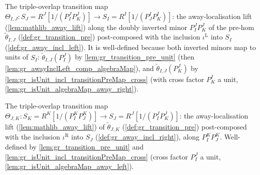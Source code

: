\begin{definition}

  \label{def:gr_cocycle_theta_ij}
  The triple-overlap transition map
  \(\Theta_{I,J} : S_J = R^J[1/(P^J_I P^J_K)] \to S_I = R^I[1/(P^I_J P^I_K)]\):
  the away-localisation lift (\cref{lem:mathlib_away_lift}) along the doubly
  inverted minor \(P^J_I P^J_K\) of the pre-hom \(\tilde\theta_{I,J}\)
  (\cref{def:gr_transition_pre}) post-composed with the inclusion
  \(\iota^{\mathrm{L}}\) into \(S_I\) (\cref{def:gr_away_incl_left}). It is
  well-defined because both inverted minors map to units of \(S_I\):
  \(\tilde\theta_{I,J}(P^J_I)\) by \cref{lem:gr_transition_pre_unit} (then
  \cref{lem:gr_awayInclLeft_comp_algebraMap}), and \(\tilde\theta_{I,J}(P^J_K)\)
  by \cref{lem:gr_isUnit_incl_transitionPreMap_cross} (with cross factor
  \(P^I_K\) a unit, \cref{lem:gr_isUnit_algebraMap_away_right}).
\end{definition}

\begin{definition}

  \label{def:gr_cocycle_theta_jk}
  The triple-overlap transition map
  \(\Theta_{J,K} : S_K = R^K[1/(P^K_I P^K_J)] \to S_J = R^J[1/(P^J_I P^J_K)]\):
  the away-localisation lift (\cref{lem:mathlib_away_lift}) of
  \(\tilde\theta_{J,K}\) (\cref{def:gr_transition_pre}) post-composed with the
  inclusion \(\iota^{\mathrm{R}}\) into \(S_J\) (\cref{def:gr_away_incl_right}),
  along \(P^K_I P^K_J\). Well-defined by \cref{lem:gr_transition_pre_unit} and
  \cref{lem:gr_isUnit_incl_transitionPreMap_cross} (cross factor \(P^J_I\) a
  unit, \cref{lem:gr_isUnit_algebraMap_away_left}).
\end{definition}

